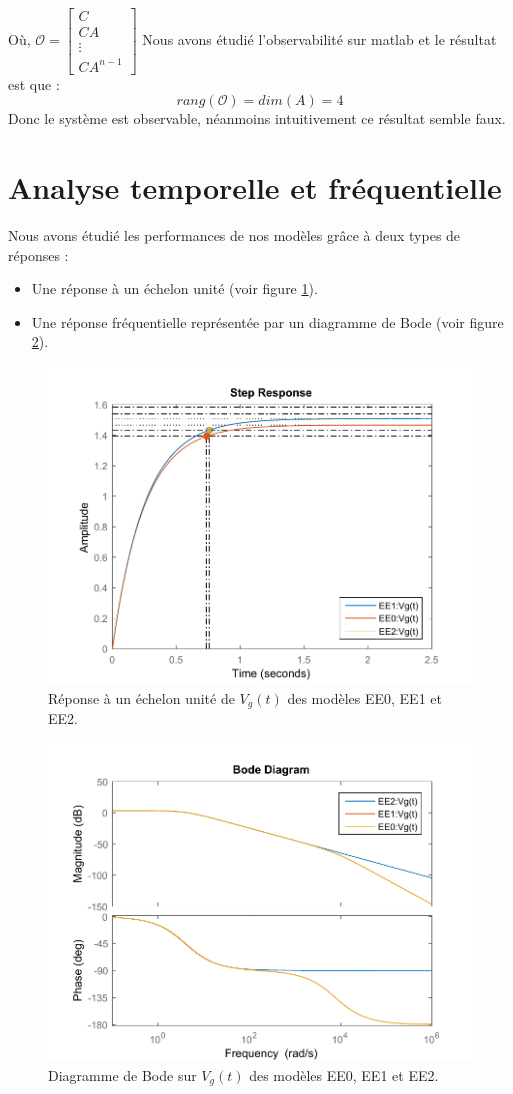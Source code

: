 Où, $ \mathcal{O} = \begin{bmatrix} C \\ CA \\ \vdots \\ CA^{n−1} \end{bmatrix}$
Nous avons étudié l'observabilité sur matlab et le résultat est que :
$$rang(\mathcal{O}) = dim(A)=4 $$
Donc le système est observable, néanmoins intuitivement ce résultat semble faux.

\section{Analyse temporelle et fréquentielle}
Nous avons étudié les performances de nos modèles grâce à deux types de réponses : 
\begin{itemize}
\item Une réponse à un échelon unité (voir figure \ref{fig:echelon}).
\item Une réponse fréquentielle représentée par un diagramme de Bode (voir figure \ref{fig:bode}).
\end{itemize}

\begin{figure}[!ht]
\centering
\includegraphics[width=.8\textwidth]{./II/images/echelon.pdf}
\caption{\label{fig:echelon}Réponse à un échelon unité de $V_g(t)$ des modèles EE0, EE1 et EE2.}
\end{figure}
\begin{figure}[!ht]
\centering
\includegraphics[width=.8\textwidth]{./II/images/bode.pdf}
\caption{\label{fig:bode}Diagramme de Bode sur $V_g(t)$ des modèles EE0, EE1 et EE2.}
\end{figure}

